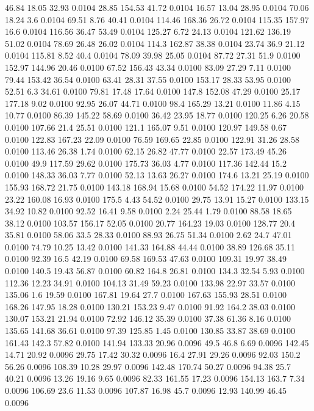 46.84	18.05	32.93	0.0104
28.85	154.53	41.72	0.0104
16.57	13.04	28.95	0.0104
70.06	18.24	3.6	0.0104
69.51	8.76	40.41	0.0104
114.46	168.36	26.72	0.0104
115.35	157.97	16.6	0.0104
116.56	36.47	53.49	0.0104
125.27	6.72	24.13	0.0104
121.62	136.19	51.02	0.0104
78.69	26.48	26.02	0.0104
114.3	162.87	38.38	0.0104
23.74	36.9	21.12	0.0104
115.81	8.52	40.4	0.0104
78.09	39.98	25.05	0.0104
87.72	27.31	51.9	0.0100
152.97	144.96	20.46	0.0100
67.52	156.43	43.34	0.0100
83.09	27.29	7.11	0.0100
79.44	153.42	36.54	0.0100
63.41	28.31	37.55	0.0100
153.17	28.33	53.95	0.0100
52.51	6.3	34.61	0.0100
79.81	17.48	17.64	0.0100
147.8	152.08	47.29	0.0100
25.17	177.18	9.02	0.0100
92.95	26.07	44.71	0.0100
98.4	165.29	13.21	0.0100
11.86	4.15	10.77	0.0100
86.39	145.22	58.69	0.0100
36.42	23.95	18.77	0.0100
120.25	6.26	20.58	0.0100
107.66	21.4	25.51	0.0100
121.1	165.07	9.51	0.0100
120.97	149.58	0.67	0.0100
122.83	167.23	22.09	0.0100
76.59	169.65	22.85	0.0100
122.91	31.26	28.58	0.0100
113.46	26.38	1.74	0.0100
62.15	26.82	47.77	0.0100
22.57	173.49	45.26	0.0100
49.9	117.59	29.62	0.0100
175.73	36.03	4.77	0.0100
117.36	142.44	15.2	0.0100
148.33	36.03	7.77	0.0100
52.13	13.63	26.27	0.0100
174.6	13.21	25.19	0.0100
155.93	168.72	21.75	0.0100
143.18	168.94	15.68	0.0100
54.52	174.22	11.97	0.0100
23.22	160.08	16.93	0.0100
175.5	4.43	54.52	0.0100
29.75	13.91	15.27	0.0100
133.15	34.92	10.82	0.0100
92.52	16.41	9.58	0.0100
2.24	25.44	1.79	0.0100
88.58	18.65	38.12	0.0100
103.57	156.17	52.05	0.0100
20.77	164.23	19.03	0.0100
128.77	20.4	35.81	0.0100
58.06	33.5	28.33	0.0100
88.93	26.75	51.34	0.0100
2.62	24.7	47.01	0.0100
74.79	10.25	13.42	0.0100
141.33	164.88	44.44	0.0100
38.89	126.68	35.11	0.0100
92.39	16.5	42.19	0.0100
69.58	169.53	47.63	0.0100
109.31	19.97	38.49	0.0100
140.5	19.43	56.87	0.0100
60.82	164.8	26.81	0.0100
134.3	32.54	5.93	0.0100
112.36	12.23	34.91	0.0100
104.13	31.49	59.23	0.0100
133.98	22.97	33.57	0.0100
135.06	1.6	19.59	0.0100
167.81	19.64	27.7	0.0100
167.63	155.93	28.51	0.0100
168.26	147.95	18.28	0.0100
130.21	153.23	9.47	0.0100
91.92	164.2	38.03	0.0100
130.07	153.21	21.94	0.0100
72.92	146.12	35.39	0.0100
37.38	61.36	8.16	0.0100
135.65	141.68	36.61	0.0100
97.39	125.85	1.45	0.0100
130.85	33.87	38.69	0.0100
161.43	142.3	57.82	0.0100
141.94	133.33	20.96	0.0096
49.5	46.8	6.69	0.0096
142.45	14.71	20.92	0.0096
29.75	17.42	30.32	0.0096
16.4	27.91	29.26	0.0096
92.03	150.2	56.26	0.0096
108.39	10.28	29.97	0.0096
142.48	170.74	50.27	0.0096
94.38	25.7	40.21	0.0096
13.26	19.16	9.65	0.0096
82.33	161.55	17.23	0.0096
154.13	163.7	7.34	0.0096
106.69	23.6	11.53	0.0096
107.87	16.98	45.7	0.0096
12.93	140.99	46.45	0.0096
